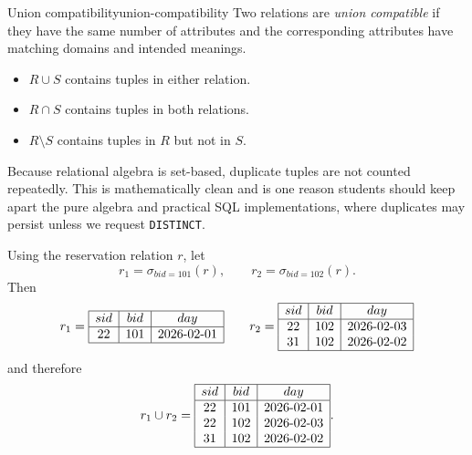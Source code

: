 \documentclass[11pt,a4paper,openany]{book}
\newcommand{\RAselect}{\sigma}
\begin{document}
\begin{definition}{Union compatibility}{union-compatibility}
Two relations are \emph{union compatible} if they have the same number of attributes and the corresponding attributes have matching domains and intended meanings.
\end{definition}

\begin{itemize}
\item \(R \cup S\) contains tuples in either relation.
\item \(R \cap S\) contains tuples in both relations.
\item \(R \setminus S\) contains tuples in \(R\) but not in \(S\).
\end{itemize}

Because relational algebra is set-based, duplicate tuples are not counted repeatedly. This is mathematically clean and is one reason students should keep apart the pure algebra and practical SQL implementations, where duplicates may persist unless we request \texttt{DISTINCT}.

Using the reservation relation \(r\), let
\[
r_1=\RAselect_{bid=101}(r),\qquad r_2=\RAselect_{bid=102}(r).
\]
Then
\[
r_1=
\begin{array}{|c|c|c|}\hline
sid&bid&day\\\hline
22&101&2026\text{-}02\text{-}01\\\hline
\end{array}
\qquad
r_2=
\begin{array}{|c|c|c|}\hline
sid&bid&day\\\hline
22&102&2026\text{-}02\text{-}03\\
31&102&2026\text{-}02\text{-}02\\\hline
\end{array}
\]
and therefore
\[
r_1\cup r_2=
\begin{array}{|c|c|c|}\hline
sid&bid&day\\\hline
22&101&2026\text{-}02\text{-}01\\
22&102&2026\text{-}02\text{-}03\\
31&102&2026\text{-}02\text{-}02\\\hline
\end{array}.
\]
\end{document}

